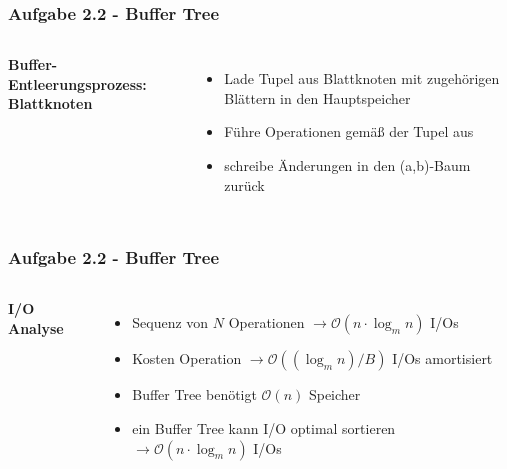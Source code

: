 \documentclass[aspectratio=169]{beamer}
\begin{document}
\begin{frame}
\frametitle{Aufgabe 2.2 - Buffer Tree}
\begin{columns}[c] %
	
	\textbf{Buffer-Entleerungsprozess: Blattknoten}
	\begin{itemize}
	\item Lade Tupel aus Blattknoten mit zugehörigen Blättern in den Hauptspeicher
	\item Führe Operationen gemäß der Tupel aus
	\item schreibe Änderungen in den (a,b)-Baum zurück
	\end{itemize}
	

	
\end{columns}
\end{frame}
							
												
\begin{frame}
\frametitle{Aufgabe 2.2 - Buffer Tree}
\begin{columns}[c] %
	
	\textbf{I/O Analyse}
	\begin{itemize}
	\item Sequenz von $N$ Operationen $\rightarrow \mathcal{O}(n\cdot \log_{m} n)$ I/Os
	\item Kosten Operation $\rightarrow\mathcal{O}((\log_{m} n)/B)$ I/Os amortisiert
	\item Buffer Tree benötigt $\mathcal{O}(n)$ Speicher
	\item ein Buffer Tree kann I/O optimal sortieren $\rightarrow\mathcal{O}(n\cdot \log_{m} n)$ I/Os
	\end{itemize}
	

	
\end{columns}
\end{frame}
									
							
\end{document}
